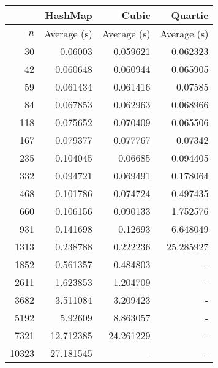 \begin{tabular}{rrrr}
    &	HashMap	&	Cubic	&	Quartic	\\\hline
    $n$	&	Average (s)	&	Average (s)	&	Average (s)	\\\hline
    30	&	0.06003	&	0.059621	&	0.062323	\\
    42	&	0.060648	&	0.060944	&	0.065905	\\
    59	&	0.061434	&	0.061416	&	0.07585	\\
    84	&	0.067853	&	0.062963	&	0.068966	\\
    118	&	0.075652	&	0.070409	&	0.065506	\\
    167	&	0.079377	&	0.077767	&	0.07342	\\
    235	&	0.104045	&	0.06685	&	0.094405	\\
    332	&	0.094721	&	0.069491	&	0.178064	\\
    468	&	0.101786	&	0.074724	&	0.497435	\\
    660	&	0.106156	&	0.090133	&	1.752576	\\
    931	&	0.141698	&	0.12693	&	6.648049	\\
    1313	&	0.238788	&	0.222236	&	25.285927	\\
    1852	&	0.561357	&	0.484803	&	-	\\
    2611	&	1.623853	&	1.204709	&	-	\\
    3682	&	3.511084	&	3.209423	&	-	\\
    5192	&	5.92609	&	8.863057	&	-	\\
    7321	&	12.712385	&	24.261229	&	-	\\
    10323	&	27.181545	&	-	&	-	\\
\end{tabular}